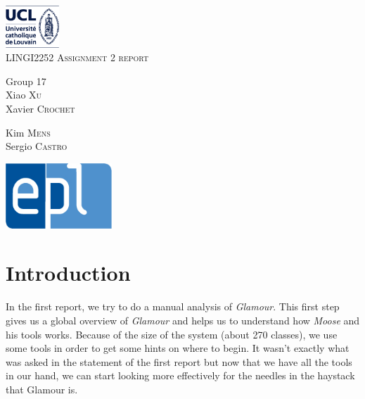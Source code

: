 \documentclass[11pt,a4paper]{report}
\begin{document}
\begin{titlepage}
\begin{center}
\includegraphics[width=0.15\textwidth]{UCL.png}
\vfill
\hrulefill
\\[1.2cm]
\textsc{\LARGE LINGI2252 Assignment 2 report}\\[1.2cm]
\hrulefill
\vfill
\begin{minipage}{0.4\textwidth}
\begin{flushleft} \large
Group 17\\
Xiao \textsc{Xu}\\ Xavier \textsc{Crochet}
\end{flushleft}
\end{minipage}
\begin{minipage}{0.4\textwidth}
\begin{flushright} \large
Kim \textsc{Mens} \\
Sergio \textsc{Castro} \\
\end{flushright}
\end{minipage}
\vfill
\includegraphics[width=0.30\textwidth]{EPL.jpg}\\
\vfill
\end{center}
\end{titlepage}

\tableofcontents
\newpage
\part{Introduction}
In the first report, we try to do a manual analysis of \textit{Glamour}. This first step gives us a global overview of \textit{Glamour} and helps us to understand how \textit{Moose} and his tools works. Because of the size of the system (about 270 classes), we use some tools in order to get some hints on where to begin. It wasn't exactly what was asked in the statement of the first report but now that we have all the tools in our hand, we can start looking more effectively for the needles in the haystack that Glamour is.
\end{document}

